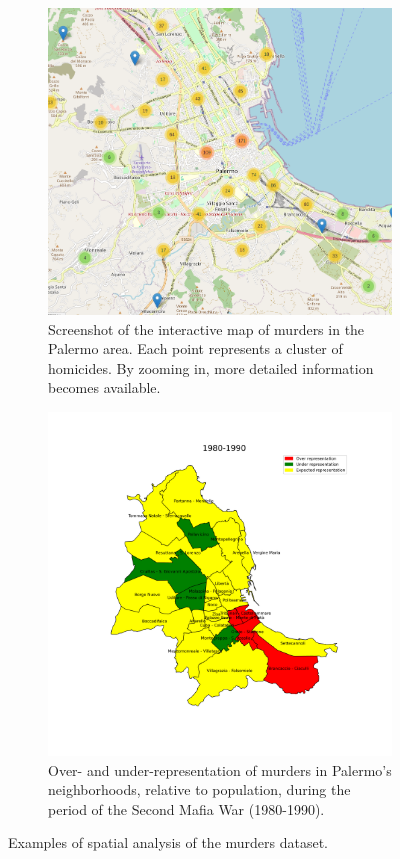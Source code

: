 \begin{figure}[h]
  \centering
  \begin{subfigure}[t]{.41\textwidth}
    \centering
    \includegraphics[width=\textwidth]{figures/interactivemap.png}
    \caption{Screenshot of the interactive map of murders in the Palermo area. Each point represents a cluster of homicides. By zooming in, more detailed information becomes available.}
    \label{fig:interactivemap}
  \end{subfigure}%
  \begin{subfigure}[t]{.41\textwidth}
    \centering
    \includegraphics[width=\textwidth]{figures/palermomap-1980.png}
    \caption{Over- and under-representation of murders in Palermo's neighborhoods, relative to population, during the period of the Second Mafia War (1980-1990).}
    \label{fig:overunder}
  \end{subfigure}
  \caption{Examples of spatial analysis of the murders dataset.}
\end{figure}
